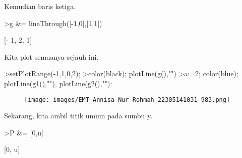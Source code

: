 \documentclass[a4paper,10pt]{article}
\begin{document}
\begin{eulernotebook}
\begin{eulercomment}
\begin{eulercomment}
\begin{eulercomment}
\begin{eulercomment}
\begin{euleroutput}
                              [- a, - 1, 0]
  
\end{euleroutput}
\begin{eulercomment}
Kemudian baris ketiga.
\end{eulercomment}
\begin{eulerprompt}
>g &= lineThrough([-1,0],[1,1])
\end{eulerprompt}
\begin{euleroutput}
  
                               [- 1, 2, 1]
  
\end{euleroutput}
\begin{eulercomment}
Kita plot semuanya sejauh ini.
\end{eulercomment}
\begin{eulerprompt}
>setPlotRange(-1,1,0,2);
>color(black); plotLine(g(),"")
>a:=2; color(blue); plotLine(g1(),""), plotLine(g2(),""):
\end{eulerprompt}
\begin{figure}[h]
    \centering
    \texttt{[image: images/EMT\_Annisa Nur Rohmah\_22305141031-983.png]}
\end{figure}
\begin{eulercomment}
Sekarang, kita ambil titik umum pada sumbu y.
\end{eulercomment}
\begin{eulerprompt}
>P &= [0,u]
\end{eulerprompt}
\begin{euleroutput}
  
                                  [0, u]
  

\end{euleroutput}
\end{eulercomment}
\end{eulercomment}
\end{eulercomment}
\end{eulercomment}
\end{eulernotebook}
\end{document}
